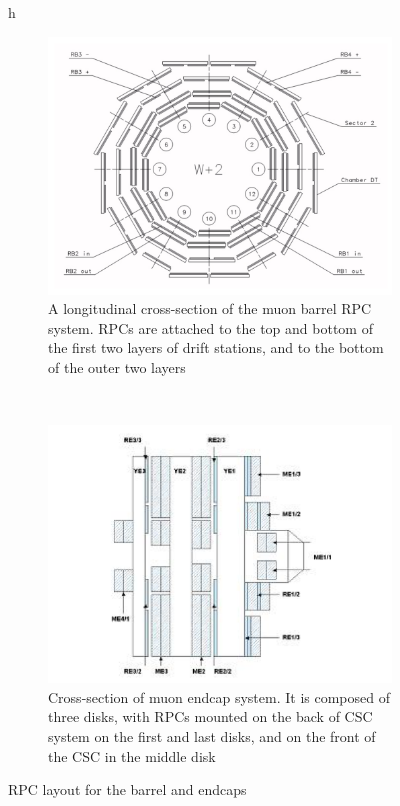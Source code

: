 \begin{figure}{h}
    \centering
    \begin{subfigure}[h]{0.40\textwidth}
        \includegraphics[width=\textwidth]{Figures/CMS_Diagrams/Muon__RPC_barrel_layout.pdf}
        \caption{A longitudinal cross-section of the muon barrel RPC
          system.  RPCs are attached to the top and bottom of the
          first two layers of drift stations, and to the bottom of the
        outer two layers}\label{fig:muon_rpc_barrel_layout}
      \end{subfigure}
      ~ %
    \begin{subfigure}[h]{0.40\textwidth}
        \includegraphics[width=\textwidth]{Figures/CMS_Diagrams/Muon__RPC_endcap_layout.pdf}
        \caption{Cross-section of muon endcap system.  It is composed
          of three disks, with RPCs mounted on the back of CSC system
          on the first and last disks, and on the front of the CSC in the middle disk}\label{fig:muon_rpc_endcap_layout}
      \end{subfigure}
      \caption{RPC layout for the barrel and endcaps}\label{fig:muon_rpc_layout}
\end{figure}

